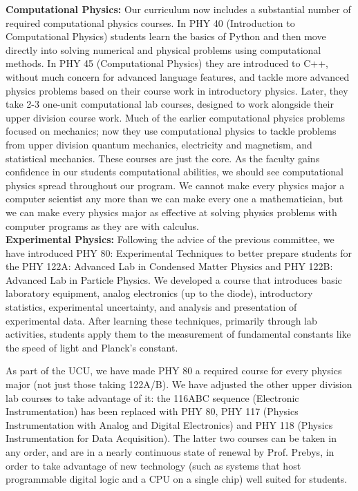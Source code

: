 \documentclass[12pt]{article}
\begin{document}
\noindent
{\bf Computational Physics:} Our curriculum now includes a substantial
number of required computational physics courses.  In PHY 40
(Introduction to Computational Physics) students learn the basics of
Python and then move directly into solving numerical and physical
problems using computational methods.  In PHY 45 (Computational
Physics) they are introduced to C++, without much concern for advanced
language features, and tackle more advanced physics problems based on
their course work in introductory physics.  Later, they take 2-3
one-unit computational lab courses, designed to work alongside their
upper division course work.  Much of the earlier computational physics
problems focused on mechanics; now they use computational physics to
tackle problems from upper division quantum mechanics, electricity and
magnetism, and statistical mechanics. These courses are just the core.
As the faculty gains confidence in our students computational
abilities, we should see computational physics spread throughout our
program.  We cannot make every physics major a computer scientist any
more than we can make every one a mathematician, but we can make every
physics major as effective at solving physics problems with computer
programs as they are with calculus.\\[3pt]

\noindent
{\bf Experimental Physics:} Following the advice of the previous
committee, we have introduced PHY 80: Experimental Techniques to
better prepare students for the PHY 122A: Advanced Lab in Condensed
Matter Physics and PHY 122B: Advanced Lab in Particle Physics.  We
developed a course that introduces basic laboratory equipment, analog
electronics (up to the diode), introductory statistics, experimental
uncertainty, and analysis and presentation of experimental data.
After learning these techniques, primarily through lab activities,
students apply them to the measurement of fundamental constants like
the speed of light and Planck's constant.

As part of the UCU, we have made PHY 80 a required course for every
physics major (not just those taking 122A/B).  We have adjusted the
other upper division lab courses to take advantage of it: the 116ABC
sequence (Electronic Instrumentation) has been replaced with PHY 80,
PHY 117 (Physics Instrumentation with Analog and Digital Electronics)
and PHY 118 (Physics Instrumentation for Data Acquisition).  The latter
two courses can be taken in any order, and are in a nearly continuous
state of renewal by Prof. Prebys, in order to take advantage of new
technology (such as systems that host programmable digital logic and a
CPU on a single chip) well suited for students.
\end{document}
